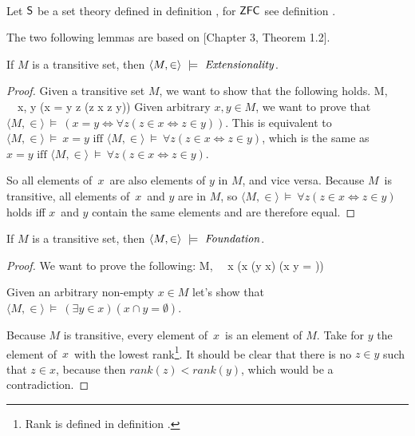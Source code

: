 \

Let $\sf{S}$ be a set theory defined in definition , for $\sf{ZFC}$ see definition .


The two following lemmas are based on \cite{DrakeBook}[Chapter 3, Theorem 1.2].
\begin{lemma}\label{lemma:extensionality_in_transitive} %
If $M$ is a transitive set, then $\langle M, \in \rangle~\models~\mbox{\emph{Extensionality}}$.
\end{lemma}

\begin{proof}
Given a transitive set $M$, we want to show that the following holds.
\beq
\langle M, \in \rangle~\models~\forall x, y (x = y \iff \forall z (z \in x \iff z \in y))
\eeq 
Given arbitrary $x, y \in M$, we want to prove that $\langle M, \in \rangle~\models~(x = y \iff \forall z (z \in x \iff z \in y))$.
This is equivalent to %
$\langle M, \in \rangle~\models~x = y \mbox{ iff } \langle M, \in \rangle~\models~\forall z(z \in x \iff z \in y)$, 
which is the same as $x = y \mbox{ iff } \langle M, \in \rangle~\models~\forall z(z \in x \iff z \in y)$.

So all elements of~$x$~are also elements of $y$ in $M$, and vice versa. 
Because $M$ is transitive, all elements of~$x$~and $y$ are in $M$, 
so $\langle M, \in \rangle~\models~\forall z(z \in x \iff z \in y)$ holds iff $x$ and $y$ contain the same elements and are therefore equal.
\end{proof}

\begin{lemma}\label{lemma:foundation_in_transitive}
If $M$ is a transitive set, then $\langle M, \in \rangle~\models~\mbox{\emph{Foundation}}$.
\end{lemma}

\begin{proof}
We want to prove the following:
\beq
\langle M, \in \rangle~\models~\forall x (x \neq \emptyset \then (\exists y \in x) (x \cap y = \emptyset))
\eeq

Given an arbitrary non-empty $x \in M$ let's show that $\langle M, \in \rangle~\models~(\exists y \in x) (x \cap y = \emptyset)$.

Because $M$ is transitive, every element of~$x$~is an element of $M$. Take for $y$ the element of~$x$~with the lowest rank\footnote{Rank is defined in definition .}. It should be clear that there is no $z \in y$ such that $z \in x$, because then $rank(z) < rank(y)$, which would be a contradiction.
\end{proof}

